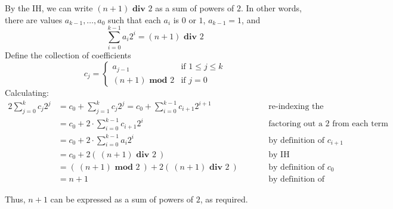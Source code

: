 By the IH, we can write $(n+1) \textbf{ div } 2$ as 
a sum of powers of $2$. In other words, 
there are values $a_{k-1}, \ldots, a_0$ such that each $a_i$ is $0$ or $1$, $a_{k-1} = 1$, 
and
\[
    \sum_{i=0}^{k-1} a_i 2^i = (n+1) \textbf{ div } 2   
\]
Define the collection of coefficients
\[
   c_{j} = 
   \begin{cases}
        a_{j-1} \qquad&\text{if $1 \leq j \leq k$}\\
        (n+1) \textbf{ mod } 2 &\text{if $j = 0$}
   \end{cases}
\]
Calculating: 
\begin{alignat*}{2}
    \sum_{j=0}^k c_j 2^j &= c_0 + \sum_{j=1}^k c_j 2^j 
    = c_0 + \sum_{i=0}^{k-1} c_{i+1} 2^{i+1} &\qquad &\text{re-indexing the summation}\\
    &= c_0 + 2 \cdot \sum_{i=0}^{k-1} c_{i+1}2^i &\qquad &\text{factoring out a $2$ from each term in the sum}\\
    &= c_0 + 2 \cdot \sum_{i=0}^{k-1} a_{i} 2^i &\qquad &\text{by definition of $c_{i+1}$}\\
    &= c_0 + 2 \left(~(n+1) \textbf{ div } 2 ~\right) &\qquad &\text{by IH} \\
    &= \left(~ (n+1) \textbf{ mod } 2 ~\right ) + 2 \left(~(n+1) \textbf{ div } 2 ~\right) &\qquad &\text{by definition of $c_0$} \\
    &= n+1 &\qquad&\text{by definition of long division}
\end{alignat*}

Thus, $n+1$ can be expressed as a sum of powers of $2$, as required.